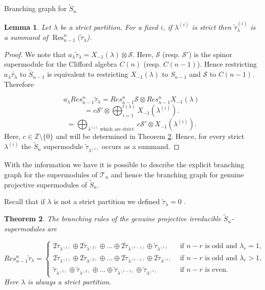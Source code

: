\documentclass[a4paper,10pt]{amsart}
\newtheorem{theorem}{Theorem}[section]
\newtheorem{lemma}[theorem]{Lemma}
\DeclareMathOperator{\Res}{Res}
\begin{document}
\begin{section}{Branching graph for $\tilde{S}_n$}
\begin{lemma} Let $\lambda$ be a strict partition. For a fixed $i$, if $\lambda^{(i)}$ is strict then $\tilde{\tau}_\lambda^{(i)}$ is a summand of $\Res_{n-1}^n(\tilde{\tau}_\lambda$). \end{lemma}

\begin{proof} We note that $a_\lambda \tilde{\tau}_\lambda = X_{-1}(\lambda) \otimes \mathcal{S}$. Here, $\mathcal{S}$ (resp. $\mathcal{S}'$) is the spinor supermodule for the Clifford algebra  $C(n)$ (resp. $C(n-1)$). Hence restricting $a_\lambda \tilde{\tau_\lambda} $ to $\tilde{S}_{n-1}$ is equivalent to restricting $X_{-1}(\lambda)$ to $S_{n-1}$ and $\mathcal{S}$ to $C(n-1)$. Therefore

$$a_\lambda Res^{n}_{n-1} \tilde{\tau}_\lambda = Res^{n}_{n-1}\mathcal{S} \otimes Res^{n}_{n-1} X_{-1}(\lambda) $$
$$= c \mathcal{S}' \otimes \bigoplus_{i=1}^{l(\lambda)} X_{-1}(\lambda^{(i)}).$$
$$= \bigoplus_{{\lambda^{(i)}} \text{ which are strict }} c\mathcal{S}' \otimes X_{-1}(\lambda^{(i)}).$$%
Here, $c \in \mathbb{Z}\setminus\{0\}$ and will be determined in Theorem \ref{branchingrules}.
Hence, for every strict $\lambda^{(i)}$ the $\tilde{S}_n$ supermodule $\tilde{\tau}_{\lambda^{(i)}}$ occurs as a summand.\end{proof} 
With the information we have it is possible to describe the explicit branching graph for the supermodules of $\mathcal{T}_n$ and hence the branching graph for genuine projective supermodules of $\tilde{S}_n$.


Recall that if $\lambda$ is not a strict partition we defined $\tilde{\tau}_\lambda = 0$ .
\begin{theorem}\label{branchingrules}The branching rules of the genuine projective irreducible $\tilde{S}_n$-supermodules are

$$Res^{n}_{n-1}  \tilde{\tau}_\lambda = 
\begin{cases} 
2\tilde{\tau}_{\lambda^{(1)}}\oplus 2\tilde{\tau}_{\lambda^{(2)}}\oplus \ldots \oplus  2\tilde{\tau}_{\lambda^{(r-1)}}\oplus  \tilde{\tau}_{\lambda^{(r)}} & \text{ if } n-r \text{ is odd and } \lambda_r = 1, \\
2\tilde{\tau}_{\lambda^{(1)}}\oplus 2\tilde{\tau}_{\lambda^{(2)}}\oplus \ldots \oplus  2\tilde{\tau}_{\lambda^{(r-1)}}\oplus  2\tilde{\tau}_{\lambda^{(r)}} & \text{ if } n-r \text{ is odd and } \lambda_r > 1, \\
\tilde{\tau}_{\lambda^{(1)}}\oplus \tilde{\tau}_{\lambda^{(2)}}\oplus \ldots \oplus  \tilde{\tau}_{\lambda^{(r-1)}}\oplus  \tilde{\tau}_{\lambda^{(r)}} & \text{ if } n-r \text{ is even.}\end{cases}$$
Here $\lambda$ is always a strict partition.
 \end{theorem} 


\end{section}
\end{document}
